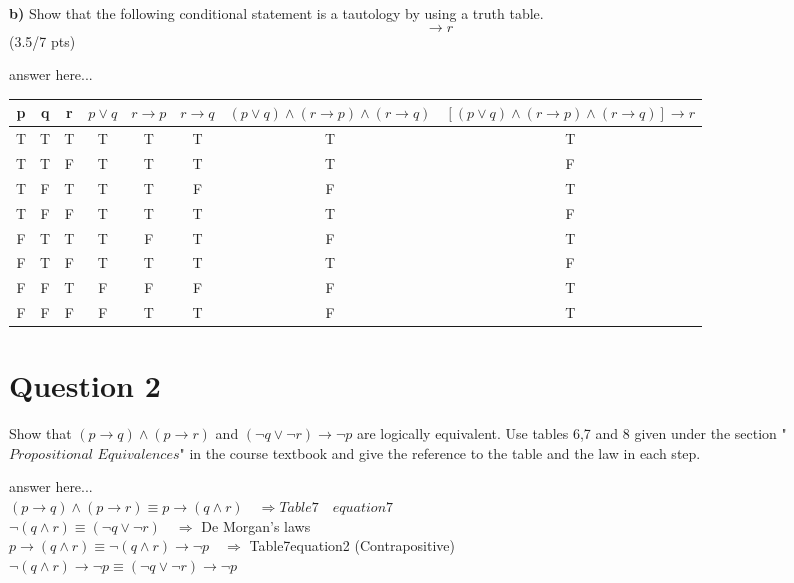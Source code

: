 \documentclass[a4paper,12pt]{article}
\newcommand\tab[1][1cm]{\hspace*{#1}}
\begin{document}
\tab \textbf{b)} Show that the following conditional statement is a tautology by using a truth table.
\begin{equation*}
    [(p \vee q) \wedge (r \rightarrow p) \wedge (r \rightarrow q)] \rightarrow r
\end{equation*}
\hfill \small{(3.5/7 pts)}\\
\newpage
\begin{tcolorbox}
answer here...\\
\scriptsize
\begin{tabular}{|c|c|c|c|c|c|c|c|}
     \hline
     p&q&r&$p\lor q$&$ r \rightarrow p $&$ r \rightarrow q $&$ (p\lor q )\land (r \rightarrow p) \land  (r \rightarrow q) $&$ [(p\lor q )\land (r \rightarrow p) \land  (r \rightarrow q) ] \rightarrow r$\\ 
     \hline \hline
     T&T&T&T&T&T&T&T\\
     \hline
     T&T&F&T&T&T&T&F\\
     \hline
     T&F&T&T&T&F&F&T\\
     \hline
     T&F&F&T&T&T&T&F\\
     \hline
     F&T&T&T&F&T&F&T\\
     \hline
     F&T&F&T&T&T&T&F\\
     \hline
     F&F&T&F&F&F&F&T\\
     \hline
     F&F&F&F&T&T&F&T\\
     \hline
\end{tabular}
\vspace{1cm} %
\end{tcolorbox}

\newpage
\section*{Question 2 \hfill {}}
\tab Show that $(p \rightarrow q) \wedge (p \rightarrow r)$ and $(\neg q \vee \neg r)\rightarrow \neg p$ are logically equivalent. Use tables 6,7 and 8 given under the section "$\textit{Propositional Equivalences}$" in the course textbook and give the reference to the table and the law in each step.

\begin{tcolorbox}
answer here...\\
    $ (p \rightarrow q) \land (p \rightarrow r) \equiv p\rightarrow (q \land r) \quad \Longrightarrow Table7 \quad equation7$\\
    $ \neg (q \land r) \equiv (\neg q \lor \neg r) \quad \Longrightarrow $ De \quad Morgan’s \quad laws \\
    $ p\rightarrow (q \land r) \equiv \neg (q \land r) \rightarrow \neg p \quad \Longrightarrow $ Table7\quad equation2 (Contrapositive)\\ 
    $ \neg (q \land r) \rightarrow \neg p \equiv (\neg q \lor \neg r) \rightarrow \neg p $\\

\vspace{1cm} %
\end{tcolorbox}
\end{document}

